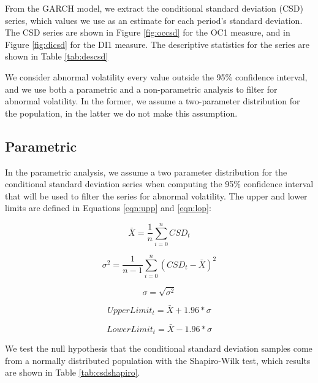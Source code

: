 \documentclass[cic,tc, english]{iiufrgs}
\begin{document}
    From the GARCH model, we extract the conditional standard deviation (CSD) series, which values we use as an estimate for each period's standard deviation. The CSD series are shown in Figure \ref{fig:occsd} for the OC1 measure, and in Figure \ref{fig:dicsd} for the DI1 measure. The descriptive statistics for the series are shown in Table \ref{tab:descsd}

    

    

    

    We consider abnormal volatility every value outside the 95\% confidence interval, and we use both a parametric and a non-parametric analysis to filter for abnormal volatility. In the former, we assume a two-parameter distribution for the population, in the latter we do not make this assumption.

\subsection{Parametric}

    In the parametric analysis, we assume a two parameter distribution for the conditional standard deviation series when computing the 95\% confidence interval that will be used to filter the series for abnormal volatility. The upper and lower limits are defined in Equations \ref{eqn:upp} and \ref{eqn:lop}: 

    $$\bar{X} = \frac{1}{n} \displaystyle\sum_{i=0}^{n} CSD_t$$

    $$\sigma^2 = \frac{1}{n-1} \displaystyle\sum_{i=0}^{n} (CSD_t - \bar{X})^2$$

    $$\sigma = \sqrt{\sigma^2}$$

    \begin{equation}
        \label{eqn:upp}
        UpperLimit_t = \bar{X} + 1.96 * \sigma
    \end{equation}

    \begin{equation}
        \label{eqn:lop}
        LowerLimit_t = \bar{X} - 1.96 * \sigma
    \end{equation}

    We test the null hypothesis that the conditional standard deviation samples come from a normally distributed population with the Shapiro-Wilk test, which results are shown in Table \ref{tab:csdshapiro}.

    
\end{document}
